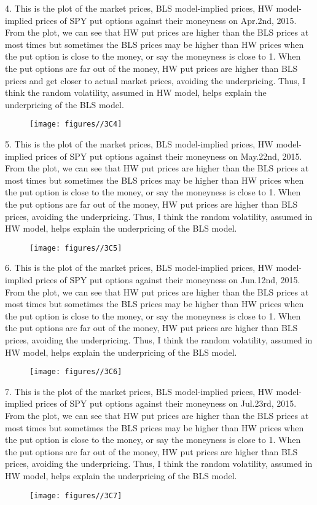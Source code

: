 \documentclass{report}
\begin{document}
4. This is the plot of the market prices, BLS model-implied prices, HW model-implied prices of SPY put options against their moneyness on Apr.2nd, 2015. From the plot, we can see that HW put prices are higher than the BLS prices at most times but sometimes the BLS prices may be higher than HW prices when the put option is close to the money, or say the moneyness is close to 1. When the put options are far out of the money, HW put prices are higher than BLS prices and get closer to actual market prices, avoiding the underpricing. Thus, I think the random volatility, assumed in HW model, helps explain the underpricing of the BLS model.
\begin{figure}[H]
        \centering 
         \texttt{[image: figures//3C4]}
\end{figure}

5. This is the plot of the market prices, BLS model-implied prices, HW model-implied prices of SPY put options against their moneyness on May.22nd, 2015. From the plot, we can see that HW put prices are higher than the BLS prices at most times but sometimes the BLS prices may be higher than HW prices when the put option is close to the money, or say the moneyness is close to 1. When the put options are far out of the money, HW put prices are higher than BLS prices, avoiding the underpricing. Thus, I think the random volatility, assumed in HW model, helps explain the underpricing of the BLS model.
\begin{figure}[H]
        \centering 
         \texttt{[image: figures//3C5]}
\end{figure}

6. This is the plot of the market prices, BLS model-implied prices, HW model-implied prices of SPY put options against their moneyness on Jun.12nd, 2015. From the plot, we can see that HW put prices are higher than the BLS prices at most times but sometimes the BLS prices may be higher than HW prices when the put option is close to the money, or say the moneyness is close to 1. When the put options are far out of the money, HW put prices are higher than BLS prices, avoiding the underpricing. Thus, I think the random volatility, assumed in HW model, helps explain the underpricing of the BLS model.
\begin{figure}[H]
        \centering 
         \texttt{[image: figures//3C6]}
\end{figure}

7. This is the plot of the market prices, BLS model-implied prices, HW model-implied prices of SPY put options against their moneyness on Jul.23rd, 2015. From the plot, we can see that HW put prices are higher than the BLS prices at most times but sometimes the BLS prices may be higher than HW prices when the put option is close to the money, or say the moneyness is close to 1. When the put options are far out of the money, HW put prices are higher than BLS prices, avoiding the underpricing. Thus, I think the random volatility, assumed in HW model, helps explain the underpricing of the BLS model.
\begin{figure}[H]
        \centering 
         \texttt{[image: figures//3C7]}
\end{figure}
\end{document}
